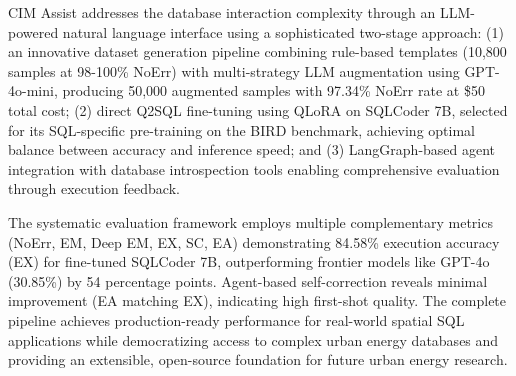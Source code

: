 \documentclass[a4paper,11pt,twoside,english]{toptesi}
\begin{document}
CIM Assist addresses the database interaction complexity through an LLM-powered natural language interface using a sophisticated two-stage approach: (1) an innovative dataset generation pipeline combining rule-based templates (10,800 samples at 98-100\% NoErr) with multi-strategy LLM augmentation using GPT-4o-mini, producing 50,000 augmented samples with 97.34\% NoErr rate at \$50 total cost; (2) direct Q2SQL fine-tuning using QLoRA on SQLCoder 7B, selected for its SQL-specific pre-training on the BIRD benchmark, achieving optimal balance between accuracy and inference speed; and (3) LangGraph-based agent integration with database introspection tools enabling comprehensive evaluation through execution feedback.

The systematic evaluation framework employs multiple complementary metrics (NoErr, EM, Deep EM, EX, SC, EA) demonstrating 84.58\% execution accuracy (EX) for fine-tuned SQLCoder 7B, outperforming frontier models like GPT-4o (30.85\%) by 54 percentage points. Agent-based self-correction reveals minimal improvement (EA matching EX), indicating high first-shot quality. The complete pipeline achieves production-ready performance for real-world spatial SQL applications while democratizing access to complex urban energy databases and providing an extensible, open-source foundation for future urban energy research.




\indici

\listoffigures
\listoftables
\lstlistoflistings



\mainmatter









\appendix





\end{document}
